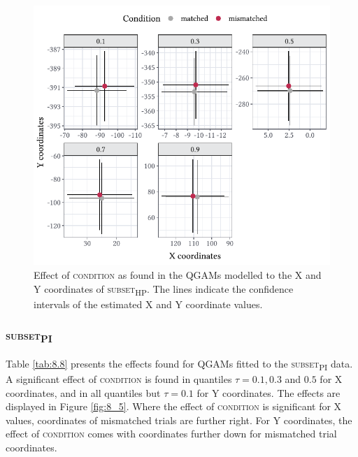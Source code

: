 \begin{figure}
    \centering
    \includegraphics[]{figures/fig8.4.pdf}
    \caption{Effect of \textsc{condition} as found in the QGAMs modelled to the X and Y coordinates of \textsc{subset\textsubscript{HP}}. The lines indicate the confidence intervals of the estimated X and Y coordinate values.}
    \label{fig:8_4}
\end{figure}

\subsubsection{\textsc{subset\textsubscript{PI}}}\label{section08_2_2_3}

Table \ref{tab:8.8} presents the effects found for QGAMs fitted to the \textsc{subset\textsubscript{PI}} data. A significant effect of \textsc{condition} is found in quantiles $\tau=0.1,0.3$ and $0.5$ for X coordinates, and in all quantiles but $\tau=0.1$ for Y coordinates. The effects are displayed in Figure \ref{fig:8_5}. Where the effect of \textsc{condition} is significant for X values, coordinates of mismatched trials are further right. For Y coordinates, the effect of \textsc{condition} comes with coordinates further down for mismatched trial coordinates.

